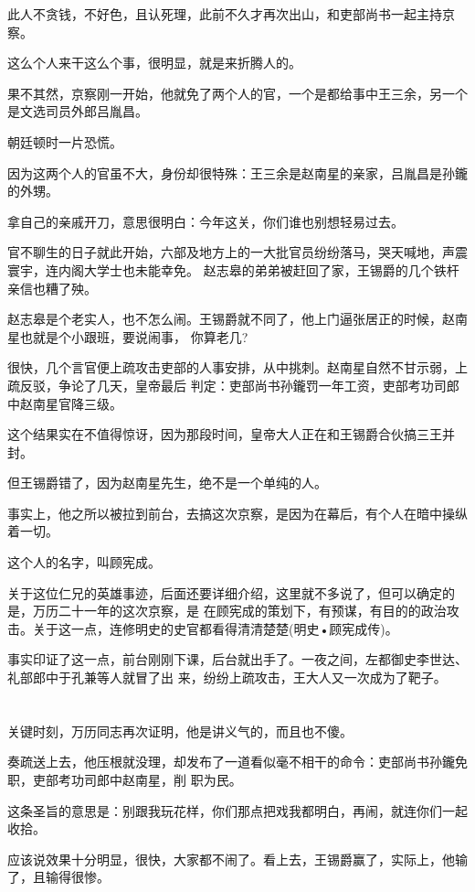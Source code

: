 \documentclass[11pt,a4paper,onecolumn]{article}
\begin{document}
此人不贪钱，不好色，且认死理，此前不久才再次出山，和吏部尚书一起主持京察。

这么个人来干这么个事，很明显，就是来折腾人的。

果不其然，京察刚一开始，他就免了两个人的官，一个是都给事中王三余，另一个是文选司员外郎吕胤昌。

朝廷顿时一片恐慌。

因为这两个人的官虽不大，身份却很特殊：王三余是赵南星的亲家，吕胤昌是孙鑨的外甥。

拿自己的亲戚开刀，意思很明白：今年这关，你们谁也别想轻易过去。

官不聊生的日子就此开始，六部及地方上的一大批官员纷纷落马，哭天喊地，声震寰宇，连内阁大学士也未能幸免。
赵志皋的弟弟被赶回了家，王锡爵的几个铁杆亲信也糟了殃。

赵志皋是个老实人，也不怎么闹。王锡爵就不同了，他上门逼张居正的时候，赵南星也就是个小跟班，要说闹事，
你算老几?

很快，几个言官便上疏攻击吏部的人事安排，从中挑刺。赵南星自然不甘示弱，上疏反驳，争论了几天，皇帝最后
判定：吏部尚书孙鑨罚一年工资，吏部考功司郎中赵南星官降三级。

这个结果实在不值得惊讶，因为那段时间，皇帝大人正在和王锡爵合伙搞三王并封。

但王锡爵错了，因为赵南星先生，绝不是一个单纯的人。

事实上，他之所以被拉到前台，去搞这次京察，是因为在幕后，有个人在暗中操纵着一切。

这个人的名字，叫顾宪成。

关于这位仁兄的英雄事迹，后面还要详细介绍，这里就不多说了，但可以确定的是，万历二十一年的这次京察，是
在顾宪成的策划下，有预谋，有目的的政治攻击。关于这一点，连修明史的史官都看得清清楚楚(明史•顾宪成传)。

事实印证了这一点，前台刚刚下课，后台就出手了。一夜之间，左都御史李世达、礼部郎中于孔兼等人就冒了出
来，纷纷上疏攻击，王大人又一次成为了靶子。

\section[\thesection]{}

关键时刻，万历同志再次证明，他是讲义气的，而且也不傻。

奏疏送上去，他压根就没理，却发布了一道看似毫不相干的命令：吏部尚书孙鑨免职，吏部考功司郎中赵南星，削
职为民。

这条圣旨的意思是：别跟我玩花样，你们那点把戏我都明白，再闹，就连你们一起收拾。

应该说效果十分明显，很快，大家都不闹了。看上去，王锡爵赢了，实际上，他输了，且输得很惨。
\end{document}
